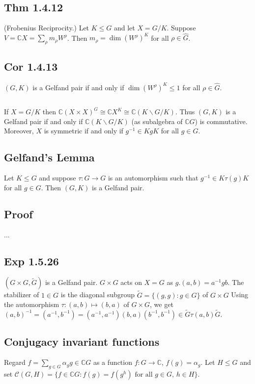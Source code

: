 \documentclass[a4paper]{amsart}
\newcommand{\C}{\mathbb{C}}
\newcommand{\CC}{\mathcal{C}}
\begin{document}
\subsection{Thm 1.4.12}
(Frobenius Reciprocity.) Let $K \leq G$ and let $X = G/K$. Suppose $V
=\C X = \sum_{\rho} m_{\rho} W^{\rho}$.  Then $m_{\rho} = \dim
(W^{\rho})^K$ for all $\rho \in \hat{G}$.

\subsection{Cor 1.4.13}
$(G, K)$ is a Gelfand pair if and only if $\dim (W^{\rho})^K \leq 1$
for all $\rho \in \hat{G}$.


\subsection{}
If $X = G/K$ then $\C(X \times X)^G \cong \C X^K \cong \C (K\backslash
G/K)$.  Thus $(G,K)$ is a Gelfand pair if and only if $\C (K\backslash
G/K)$ (as subalgebra of $\C G$) is commutative.  Moreover, $X$ is
symmetric if and only if $g^{-1} \in KgK$ for all $g\in G$.

\subsection{Gelfand's Lemma}
Let $K \leq G$ and suppose $\tau \colon G \to G$ is an automorphism
such that $g^{-1} \in K \tau(g) K$ for all $g \in G$.  Then $(G, K)$ is
a Gelfand pair.

\subsection{Proof} ...



\subsection{Exp 1.5.26}
$(G \times G, \tilde{G})$ is a Gelfand pair.
$G \times G$ acts on $X = G$ as $g.(a,b) = a^{-1} g b$.
The stabilizer of $1 \in G$ is the diagonal subgroup $\tilde{G} = \{(g, g) : g \in G\}$ of $G \times G$
Using the automorphism $\tau \colon (a, b) \mapsto (b, a)$ of $G \times G$, we get $(a, b)^{-1} = (a^{-1}, b^{-1}) = 
(a^{-1}, a^{-1})(b, a)(b^{-1}, b^{-1}) \in 
\tilde{G}\tau(a,b)\tilde{G}$.


\subsection{Conjugacy invariant functions}
Regard $f = \sum_{g \in G} \alpha_g g \in \C G$ as a function
$f \colon G \to \C$, $f(g) = \alpha_g$.
Let $H \leq G$ and set 
$\CC(G, H) = \{ f \in \C G : f(g) = f(g^h) \text{ for all } g \in G,\, h \in H\}$.
\end{document}
